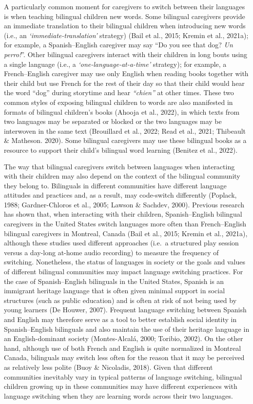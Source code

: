 \documentclass[
  man,floatsintext]{apa7}
\begin{document}
A particularly common moment for caregivers to switch between their languages is when teaching bilingual children new words. Some bilingual caregivers provide an immediate translation to their bilingual children when introducing new words (i.e., an \emph{`immediate-translation'} strategy) (Bail et al., 2015; Kremin et al., 2021a); for example, a Spanish--English caregiver may say ``Do you see that dog? \emph{Un perro!}''. Other bilingual caregivers interact with their children in long bouts using a single language (i.e., a \emph{`one-language-at-a-time'} strategy); for example, a French--English caregiver may use only English when reading books together with their child but use French for the rest of their day so that their child would hear the word ``dog'' during storytime and hear \emph{``chien''} at other times. These two common styles of exposing bilingual children to words are also manifested in formats of bilingual children's books (Ahooja et al., 2022), in which texts from two languages may be separated or blocked or the two languages may be interwoven in the same text (Brouillard et al., 2022; Read et al., 2021; Thibeault \& Matheson. 2020). Some bilingual caregivers may use these bilingual books as a resource to support their child's bilingual word learning (Benitez et al., 2022).

The way that bilingual caregivers switch between languages when interacting with their children may also depend on the context of the bilingual community they belong to. Bilinguals in different communities have different language attitudes and practices and, as a result, may code-switch differently (Poplack, 1988; Gardner-Chloros et al., 2005; Lawson \& Sachdev, 2000). Previous research has shown that, when interacting with their children, Spanish--English bilingual caregivers in the United States switch languages more often than French--English bilingual caregivers in Montreal, Canada (Bail et al., 2015; Kremin et al., 2021a), although these studies used different approaches (i.e.~a structured play session versus a day-long at-home audio recording) to measure the frequency of switching. Nonetheless, the status of languages in society or the goals and values of different bilingual communities may impact language switching practices. For the case of Spanish--English bilinguals in the United States, Spanish is an immigrant heritage language that is often given minimal support in social structures (such as public education) and is often at risk of not being used by young learners (De Houwer, 2007). Frequent language switching between Spanish and English may therefore serve as a tool to better establish social identity in Spanish--English bilinguals and also maintain the use of their heritage language in an English-dominant society (Montes-Alcalá, 2000; Toribio, 2002). On the other hand, although use of both French and English is quite normalized in Montreal Canada, bilinguals may switch less often for the reason that it may be perceived as relatively less polite (Buoy \& Nicoladis, 2018). Given that different communities inevitably vary in typical patterns of language switching, bilingual children growing up in these communities may have different experiences with language switching when they are learning words across their two languages.
\end{document}
